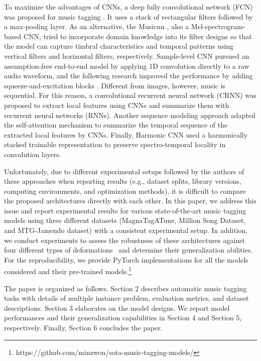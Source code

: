 \documentclass{article}
\begin{document}
To maximize the advantages of CNNs, a deep fully convolutional network (FCN) was proposed for music tagging \cite{choi2016automatic}. It uses a stack of  rectangular filters followed by a max-pooling layer.
As an alternative, the Musicnn \cite{pons2018end}, also a Mel-spectrogram-based CNN, tried to incorporate domain knowledge into its filter designs so that the model can capture timbral characteristics and temporal patterns using vertical filters and horizontal filters, respectively. Sample-level CNN \cite{lee2017sample} pursued an assumption-free end-to-end model by applying 1D convolution directly to a raw audio waveform, and the following research \cite{kim2018sample} improved the performance by adding squeeze-and-excitation blocks \cite{hu2018squeeze}. Different from images, however, music is sequential. For this reason, a convolutional recurrent neural network (CRNN) \cite{choi2017convolutional} was proposed to extract local features using CNNs and summarize them with recurrent neural networks (RNNs). Another sequence modeling approach \cite{won2019toward} adapted the self-attention mechanism \cite{devlin2018bert} to summarize the temporal sequence of the extracted local features by CNNs. Finally, Harmonic CNN \cite{won2020data} used a harmonically stacked trainable representation to preserve spectro-temporal locality in convolution layers.

Unfortunately, due to different experimental setups followed by the authors of these approaches when reporting results (e.g., dataset splits, library versions, computing environments, and optimization methods), it is difficult to compare the proposed architectures directly with each other. In this paper, we address this issue and report experimental results for various state-of-the-art music tagging models using three different datasets (MagnaTagATune, Million Song Dataset, and MTG-Jamendo dataset) with a consistent experimental setup. In addition, we conduct experiments to assess the robustness of these architectures against four different types of deformations~\cite{mcfee2015software} and determine their generalization abilities. For the reproducibility, we provide PyTorch implementations for all the models considered and their pre-trained models.\footnote{https://github.com/minzwon/sota-music-tagging-models/}

The paper is organized as follows. Section 2 describes automatic music tagging tasks with details of multiple instance problem, evaluation metrics, and dataset descriptions. Section 3 elaborates on the model designs. We report model performances and their generalization capabilities in Section 4 and Section 5, respectively. Finally, Section 6 concludes the paper.
\end{document}
